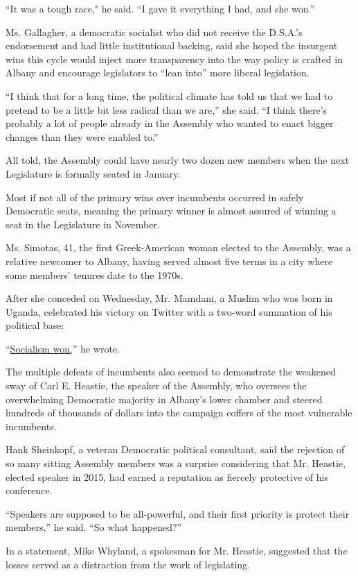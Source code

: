 ``It was a tough race," he said. ``I gave it everything I had, and she
won.''

Ms. Gallagher, a democratic socialist who did not receive the D.S.A.'s
endorsement and had little institutional backing, said she hoped the
insurgent wins this cycle would inject more transparency into the way
policy is crafted in Albany and encourage legislators to ``lean into''
more liberal legislation.

``I think that for a long time, the political climate has told us that
we had to pretend to be a little bit less radical than we are,'' she
said. ``I think there's probably a lot of people already in the Assembly
who wanted to enact bigger changes than they were enabled to.''

All told, the Assembly could have nearly two dozen new members when the
next Legislature is formally seated in January.

Most if not all of the primary wins over incumbents occurred in safely
Democratic seats, meaning the primary winner is almost assured of
winning a seat in the Legislature in November.

Ms. Simotas, 41, the first Greek-American woman elected to the Assembly,
was a relative newcomer to Albany, having served almost five terms in a
city where some members' tenures date to the 1970s.

After she conceded on Wednesday, Mr. Mamdani, a Muslim who was born in
Uganda, celebrated his victory on Twitter with a two-word summation of
his political base:

``\href{https://twitter.com/ZohranKMamdani/status/1285981158480793606}{Socialism
won,}'' he wrote.

The multiple defeats of incumbents also seemed to demonstrate the
weakened sway of Carl E. Heastie, the speaker of the Assembly, who
oversees the overwhelming Democratic majority in Albany's lower chamber
and steered hundreds of thousands of dollars into the campaign coffers
of the most vulnerable incumbents.

Hank Sheinkopf, a veteran Democratic political consultant, said the
rejection of so many sitting Assembly members was a surprise considering
that Mr. Heastie, elected speaker in 2015, had earned a reputation as
fiercely protective of his conference.

``Speakers are supposed to be all-powerful, and their first priority is
protect their members,'' he said. ``So what happened?''

In a statement, Mike Whyland, a spokesman for Mr. Heastie, suggested
that the losses served as a distraction from the work of legislating.


